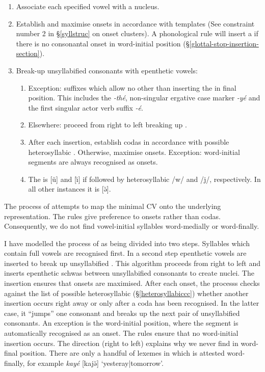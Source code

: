 \begin{enumerate}
	\item Associate each specified vowel with a  nucleus.
	\item Establish and maximise onsets in accordance with  templates (See constraint number 2 in {\S}\ref{syllstruc} on onset clusters). A phonological rule will insert a  if there is no consonantal onset in word-initial position ({\S}\ref{glottal-stop-insertion-section}).
	\item Break-up unsyllabified consonants with epenthetic vowels:
	\begin{enumerate}
		\item Exception: suffixes which allow no other  than inserting the  in final position. This includes the  \emph{-thé}, non-singular ergative case marker \emph{-yé} and the first singular actor verb suffix \emph{-é}.
		\item Elsewhere: proceed from right to left breaking up .
		\item After each  insertion, establish codas in accordance with possible heterosyllabic . Otherwise, maximise onsets. Exception: word-initial segments are always recognised as onsets.
		\item The  is [ŭ] and [ı̆] if followed by heterosyllabic /w/ and /j/, respectively. In all other instances it is [ə̆].
	\end{enumerate}
\end{enumerate}

The process of  attempts to map the minimal  CV onto the underlying representation. The rules give preference to onsets rather than codas. Consequently, we do not find vowel-initial syllables word-medially or word-finally.

I have modelled the process of  as being divided into two steps. Syllables which contain full vowels are recognised first. In a second step epenthetic vowels are inserted to break up unsyllabified . This algorithm proceeds from right to left and inserts epenthetic schwas between unsyllabified consonants to create  nuclei. The insertion ensures that onsets are maximised. After each onset, the processs checks against the list of possible heterosyllabic  ({\S}\ref{heterosyllabiccc}) whether another insertion occurs right away or only after a coda has been recognised. In the latter case, it ``jumps'' one consonant and breaks up the next pair of unsyllabified consonants. An exception is the word-initial position, where the segment is automatically recognised as an onset. The rules ensure that no word-initial  insertion occurs. The direction (right to left) explains why we never find  in word-final position. There are only a handful of lexemes in which  is attested word-finally, for example \emph{kayé} [kajə̆] `yesteray|tomorrow'.

